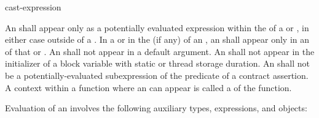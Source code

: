 \begin{bnf}
\br
     cast-expression
\end{bnf}

\pnum
An  shall appear only as a potentially evaluated
expression within the  of a
 or ,
in either case
outside of a .
In a  or in the
 (if any)
of an , an 
shall appear only in an  of that
 or .
An  shall not appear in a
default argument.
An  shall not appear in the initializer of
a block variable with static or thread storage duration.
An  shall not be
a potentially-evaluated subexpression
of the predicate of a contract assertion.
A context within a function where an  can appear
is called a  of the function.

\pnum
Evaluation of an  involves the following
auxiliary types, expressions, and objects:

